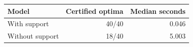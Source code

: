 \begin{tabular}{@{}lrr@{}}
\toprule
Model & Certified optima & Median seconds\\
\midrule
With support & 40/40 & 0.046\\
Without support & 18/40 & 5.003\\
\bottomrule
\end{tabular}
